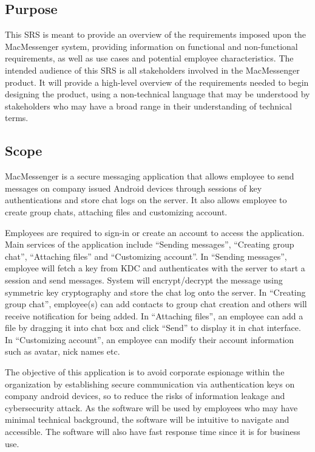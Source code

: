 \documentclass[]{article}
\begin{document}
\subsection{Purpose}
\label{sub:purpose}
\hspace{5mm}This SRS is meant to provide an overview of the requirements imposed upon the MacMessenger system, providing information on functional and non-functional requirements, as well as use cases and potential employee characteristics. The intended audience of this SRS is all stakeholders involved in the MacMessenger product. It will provide a high-level overview of the requirements needed to begin designing the product, using a non-technical language that may be understood by stakeholders who may have a broad range in their understanding of technical terms.



\subsection{Scope}
\label{sub:scope}
\hspace{5mm}MacMessenger is a secure messaging application that allows employee to send messages on company issued Android devices through sessions of key authentications and store chat logs on the server. It also allows employee to create group chats, attaching files and customizing account. 

\hspace{5mm}Employees are required to sign-in or create an account to access the application. Main services of the application include “Sending messages”, “Creating group chat”, “Attaching files” and “Customizing account”. In “Sending messages”, employee will fetch a key from KDC and authenticates with the server to start a session and send messages. System will encrypt/decrypt the message using symmetric key cryptography and store the chat log onto the server. In “Creating group chat”, employee(s) can add contacts to group chat creation and others will receive notification for being added. In “Attaching files”, an employee can add a file by dragging it into chat box and click “Send” to display it in chat interface. In “Customizing account”, an employee can modify their account information such as avatar, nick names etc.

\hspace{5mm}The objective of this application is to avoid corporate espionage within the organization by establishing secure communication via authentication keys on company android devices, so to reduce the risks of information leakage and cybersecurity attack. As the software will be used by employees who may have minimal technical background, the software will be intuitive to navigate and accessible. The software will also have fast response time since it is for business use. 
\end{document}
